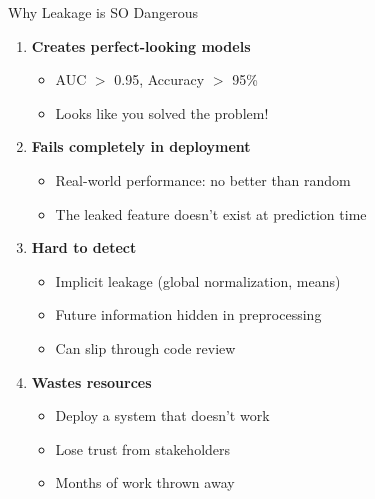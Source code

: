 \documentclass[aspectratio=169]{beamer}
\begin{document}
\begin{frame}{Why Leakage is SO Dangerous}
\begin{enumerate}
\item \textbf{Creates perfect-looking models}
\begin{itemize}
\item AUC $>$ 0.95, Accuracy $>$ 95\%
\item Looks like you solved the problem!
\end{itemize}

\vspace{0.5em}
\item \textbf{Fails completely in deployment}
\begin{itemize}
\item Real-world performance: no better than random
\item The leaked feature doesn't exist at prediction time
\end{itemize}

\vspace{0.5em}
\item \textbf{Hard to detect}
\begin{itemize}
\item Implicit leakage (global normalization, means)
\item Future information hidden in preprocessing
\item Can slip through code review
\end{itemize}

\vspace{0.5em}
\item \textbf{Wastes resources}
\begin{itemize}
\item Deploy a system that doesn't work
\item Lose trust from stakeholders
\item Months of work thrown away
\end{itemize}
\end{enumerate}
\end{frame}
\end{document}
